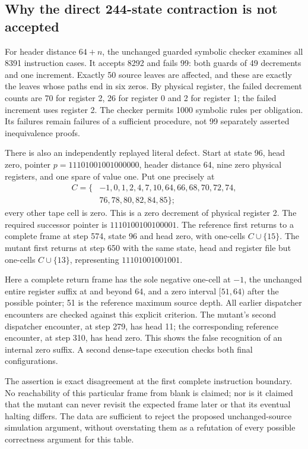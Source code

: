 \subsection{Why the direct 244-state contraction is not accepted}

For header distance $64+n$, the unchanged guarded symbolic checker examines
all 8391 instruction cases.  It accepts 8292 and fails 99: both guards of 49
decrements and one increment.  Exactly 50 source leaves are affected, and
these are exactly the leaves whose paths end in six zeros.  By physical
register, the failed decrement counts are 70 for register 2, 26 for register
0 and 2 for register 1; the failed increment uses register 2.  The checker
permits 1000 symbolic rules per obligation.  Its failures remain failures of
a sufficient procedure, not 99 separately asserted inequivalence proofs.

There is also an independently replayed literal defect.  Start at state 96,
head zero, pointer $p=11101001001000000$, header distance 64, nine zero
physical registers, and one spare of value one.  Put one precisely at
\[
\begin{split}
C=\{&-1,0,1,2,4,7,10,64,66,68,70,72,74,\\
    &76,78,80,82,84,85\};
\end{split}
\]
every other tape cell is zero.  This is a zero decrement of physical
register 2.  The required successor pointer is
$1110100100100001$.  The reference first returns to a complete frame at
step 574, state 96 and head zero, with one-cells $C\cup\{15\}$.  The mutant
first returns at step 650 with the same state, head and register file but
one-cells $C\cup\{13\}$, representing $11101001001001$.

Here a complete return frame has the sole negative one-cell at $-1$, the
unchanged entire register suffix at and beyond 64, and a zero interval
$[51,64)$ after the possible pointer; 51 is the reference maximum source
depth.  All earlier dispatcher encounters are checked against this explicit
criterion.  The mutant's second dispatcher encounter, at step 279, has head
11; the corresponding reference encounter, at step 310, has head zero.
This shows the false recognition of an internal zero suffix.  A second
dense-tape execution checks both final configurations.

The assertion is exact disagreement at the first complete instruction
boundary.  No reachability of this particular frame from blank is claimed;
nor is it claimed that the mutant can never revisit the expected frame later
or that its eventual halting differs.  The data are sufficient to reject the
proposed unchanged-source simulation argument, without overstating them as
a refutation of every possible correctness argument for this table.

